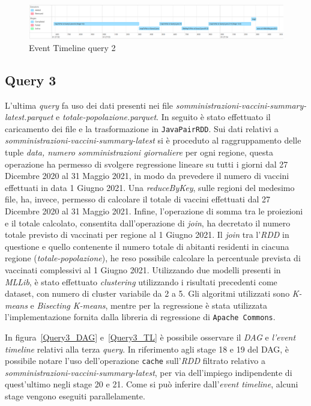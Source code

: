 \documentclass[conference]{IEEEtran}
\begin{document}
\begin{figure}[htbp]
\includegraphics[scale=0.135]{Screenshot/Query2_timeline.png}
\caption{Event Timeline query 2}\label{Query2_TL}
\label{fig}
\end{figure}

\subsection*{\textbf{Query 3}}
L'ultima \emph{query} fa uso dei dati presenti nei file \textit{somministrazioni-vaccini-summary-latest.parquet} e \textit{totale-popolazione.parquet}. In seguito \`{e} stato effettuato il caricamento dei file e la trasformazione in \texttt{JavaPairRDD}. Sui dati relativi a \textit{somministrazioni-vaccini-summary-latest} si \`{e} proceduto al raggruppamento delle tuple \emph{data, numero somministrazioni giornaliere} per ogni regione, questa operazione ha permesso di svolgere regressione lineare su tutti i giorni dal 27 Dicembre 2020 al 31 Maggio 2021, in modo da prevedere il numero di vaccini effettuati in data 1 Giugno 2021. Una \emph{reduceByKey}, sulle regioni del medesimo file, ha, invece, permesso di calcolare il totale di vaccini effettuati dal 27 Dicembre 2020 al 31 Maggio 2021. Infine, l'operazione di somma tra le proiezioni e il totale calcolato, consentita dall'operazione di \emph{join}, ha decretato il numero totale previsto di vaccinati per regione al 1 Giugno 2021. Il \emph{join} tra l'\emph{RDD} in questione e quello contenente il numero totale di abitanti residenti in ciacuna regione (\textit{totale-popolazione}), he reso possibile calcolare la percentuale prevista di vaccinati complessivi al 1 Giugno 2021. Utilizzando due modelli presenti in \emph{MLLib}, \`{e} stato effettuato \emph{clustering} utilizzando i risultati precedenti come dataset, con numero di cluster variabile da 2 a 5. Gli algoritmi utilizzati sono \emph{K-means} e \emph{Bisecting K-means}, mentre per la regressione \`{e} stata utilizzata l'implementazione fornita dalla libreria di regressione di \texttt{Apache Commons}.
\par In figura~\ref{Query3_DAG} e~\ref{Query3_TL} \`{e} possibile osservare il \emph{DAG} e \emph{l'event timeline} relativi alla terza \emph{query}. In riferimento agli stage 18 e 19 del DAG, \`{e} possibile notare l'uso dell'operazione \texttt{cache} sull'\emph{RDD} filtrato relativo a \textit{somministrazioni-vaccini-summary-latest}, per via dell'impiego indipendente di quest'ultimo negli stage 20 e 21. Come si pu\`{o} inferire dall'\emph{event timeline}, alcuni stage vengono eseguiti parallelamente.  
\end{document}
